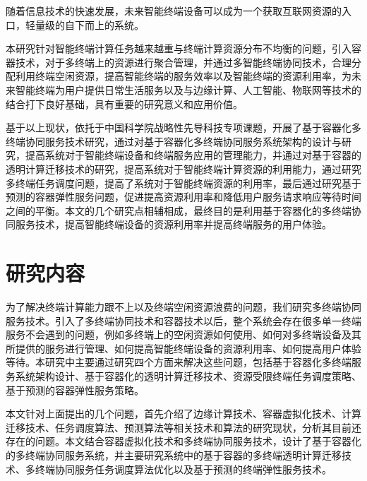 随着信息技术的快速发展，未来智能终端设备可以成为一个获取互联网资源的入口，轻量级的自下而上的系统。

本研究针对智能终端计算任务越来越重与终端计算资源分布不均衡的问题，引入容器技术，对于多终端上的资源进行聚合管理，并通过多智能终端协同技术，合理分配利用终端空闲资源，提高智能终端的服务效率以及智能终端的资源利用率，为未来智能终端为用户提供日常生活服务以及与边缘计算、人工智能、物联网等技术的结合打下良好基础，具有重要的研究意义和应用价值。

基于以上现状，依托于中国科学院战略性先导科技专项课题，开展了基于容器化多终端协同服务技术研究，通过对基于容器化多终端协同服务系统架构的设计与研究，提高系统对于智能终端设备和终端服务应用的管理能力，并通过对基于容器的透明计算迁移技术的研究，提高系统对于智能终端计算资源的利用能力，通过研究多终端任务调度问题，提高了系统对于智能终端资源的利用率，最后通过研究基于预测的容器弹性服务问题，促进提高资源利用率和降低用户服务请求响应等待时间之间的平衡。本文的几个研究点相辅相成，最终目的是利用基于容器化的多终端协同服务技术，提高智能终端设备的资源利用率并提高终端服务的用户体验。

\section{研究内容}
为了解决终端计算能力跟不上以及终端空闲资源浪费的问题，我们研究多终端协同服务技术。引入了多终端协同技术和容器技术以后，整个系统会存在很多单一终端服务不会遇到的问题，例如多终端上的空闲资源如何使用、如何对多终端设备及其所提供的服务进行管理、如何提高智能终端设备的资源利用率、如何提高用户体验等待。本研究中主要通过研究四个方面来解决这些问题，包括基于容器化多终端服务系统架构设计、基于容器化的透明计算迁移技术、资源受限终端任务调度策略、基于预测的容器弹性服务策略。

本文针对上面提出的几个问题，首先介绍了边缘计算技术、容器虚拟化技术、计算迁移技术、任务调度算法、预测算法等相关技术和算法的研究现状，分析其目前还存在的问题。本文结合容器虚拟化技术和多终端协同服务技术，设计了基于容器化的多终端协同服务系统，并主要研究系统中的基于容器的多终端透明计算迁移技术、多终端协同服务任务调度算法优化以及基于预测的终端弹性服务技术。

